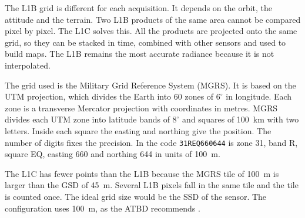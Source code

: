 The L1B grid is different for each acquisition. It depends on the orbit, the attitude and the terrain.
Two L1B products of the same area cannot be compared pixel by pixel.
The L1C solves this. All the products are projected onto the same grid, so they can be stacked in time, combined with other sensors and used to build maps.
The L1B remains the most accurate radiance because it is not interpolated.

The grid used is the Military Grid Reference System (MGRS).
It is based on the UTM projection, which divides the Earth into 60 zones of $6^\circ$ in longitude. Each zone is a transverse Mercator projection with coordinates in metres.
MGRS divides each UTM zone into latitude bands of $8^\circ$ and squares of 100~km with two letters. Inside each square the easting and northing give the position. The number of digits fixes the precision.
In the code \texttt{31REQ660644} is zone 31, band R, square EQ, easting 660 and northing 644 in units of 100~m.

The L1C has fewer points than the L1B because the MGRS tile of 100~m is larger than the GSD of 45~m.
Several L1B pixels fall in the same tile and the tile is counted once.
The ideal grid size would be the SSD of the sensor. The configuration uses 100~m, as the ATBD recommends \cite{atbd}.

